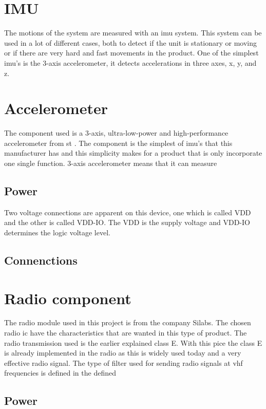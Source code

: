 \section{IMU}
The motions of the system are measured with an \gls{imu} system. This system can be used in a lot of different cases, both to detect if the unit is stationary or moving or if there are very hard and fast movements in the product. One of the simplest \gls{imu}'s is the 3-axis accelerometer, it detects accelerations in three axes, x, y, and z.


\newpage %
\section{Accelerometer} 
The component used is a 3-axis, ultra-low-power and high-performance accelerometer from \gls{st} \cite{ST_acc}. The component is the simplest of \gls{imu}'s that this manufacturer has and this simplicity makes for a product that is only incorporate one single function. 3-axis accelerometer means that it can measure 

\subsection{Power}
Two voltage connections are apparent on this device, one which is called VDD and the other is called VDD-IO. The VDD is the supply voltage and VDD-IO determines the logic voltage level. 

\subsection{Connenctions}


\newpage
\section{Radio component}
 The radio module used in this project is from the company Silabs. The chosen radio \gls{ic} have the characteristics that are wanted in this type of product. The radio transmission used is the earlier explained class E. With this pice the class E is already implemented in the radio as this is widely used today and a very effective radio signal. 
The type of filter used for sending radio signals at \gls{vhf} frequencies is defined in the defined 


\subsection{Power}


